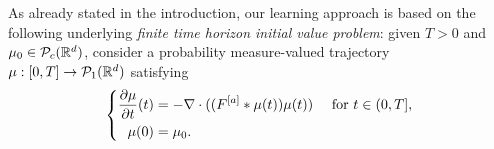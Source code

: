 As already stated in the introduction, our learning approach is based on the following underlying \textit{finite time horizon initial value problem}: given $T > 0$ and $\mu_0 \in \mathcal{P}_c(\mathbb{R}^d)$, consider a probability measure-valued trajectory $\mu:[0,T]\rightarrow \mathcal{P}_1(\mathbb{R}^d)$ satisfying 
\begin{align}\label{eq:contdyn}
\left\{\begin{aligned}
\frac{\partial \mu}{\partial t}(t) &= -\nabla \cdot ((F^{[a]}*\mu(t))\mu(t)) \quad \text{ for } t \in (0,T],\\
\mu(0) &=\mu_0.
\end{aligned}\right.
\end{align}

